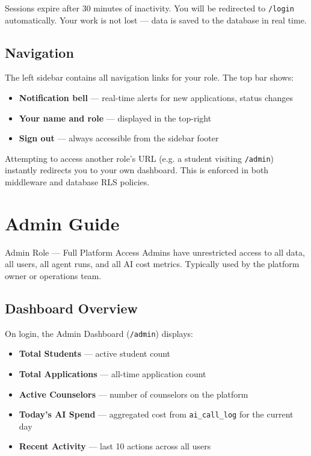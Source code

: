 \documentclass[11pt, a4paper]{article}
\begin{document}
\begin{warningbox}
Sessions expire after 30 minutes of inactivity. You will be redirected to \texttt{/login} automatically. Your work is not lost — data is saved to the database in real time.
\end{warningbox}

\subsection{Navigation}

The left sidebar contains all navigation links for your role. The top bar shows:
\begin{itemize}
  \item \textbf{Notification bell} — real-time alerts for new applications, status changes
  \item \textbf{Your name and role} — displayed in the top-right
  \item \textbf{Sign out} — always accessible from the sidebar footer
\end{itemize}

\begin{infobox}
Attempting to access another role's URL (e.g. a student visiting \texttt{/admin}) instantly redirects you to your own dashboard. This is enforced in both middleware and database RLS policies.
\end{infobox}

\section{Admin Guide}

\begin{rolebox}[admincolor]{Admin Role — Full Platform Access}
Admins have unrestricted access to all data, all users, all agent runs, and all AI cost metrics. Typically used by the platform owner or operations team.
\end{rolebox}

\subsection{Dashboard Overview}

On login, the Admin Dashboard (\texttt{/admin}) displays:

\begin{itemize}
  \item \textbf{Total Students} — active student count
  \item \textbf{Total Applications} — all-time application count
  \item \textbf{Active Counselors} — number of counselors on the platform
  \item \textbf{Today's AI Spend} — aggregated cost from \texttt{ai\_call\_log} for the current day
  \item \textbf{Recent Activity} — last 10 actions across all users
\end{itemize}
\end{document}
